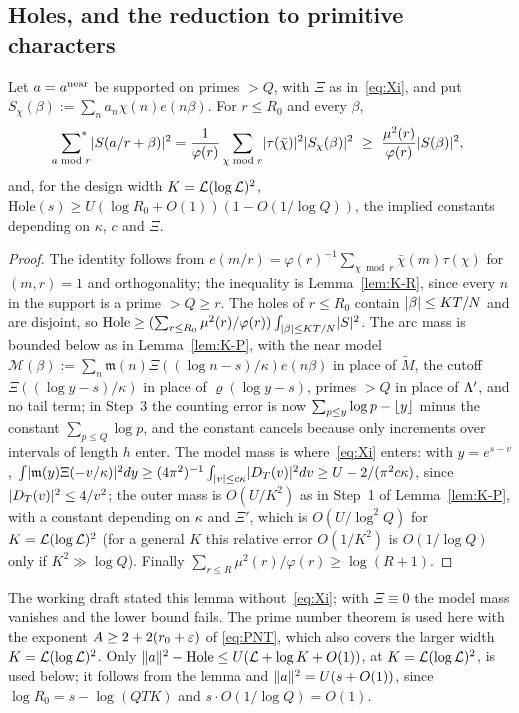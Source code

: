 \subsection{Holes, and the reduction to primitive characters}\label{ssec:shell-holes}
\begin{lemma}\label{lem:shell-4}
Let $a=a^{\rm near}$ be supported on primes $>Q$, with $\Xi$ as in~\eqref{eq:Xi}, and put $S_\chi(\beta):=\sum_na_n\chi(n)e(n\beta)$. For $r\le R_0$ and every
$\beta$,
\begin{equation}\label{eq:shell-gauss}
\sideset{}{^*}\sum_{a\bmod r}\abs{S(a/r+\beta)}^2=\frac1{\varphi(r)}\sum_{\chi\bmod r}\abs{\tau(\bar\chi)}^2\abs{S_\chi(\beta)}^2\ \ge\ \frac{\mu^2(r)}{\varphi(r)}\abs{S(\beta)}^2,
\end{equation}
and, for the design width $K=\mathcal L(\log\mathcal L)^2$, $\mathrm{Hole}(s)\ge U(\log R_0+O(1))(1-O(1/\log Q))$, the implied constants depending on $\kappa$, $c$ and $\Xi$.
\end{lemma}
\begin{proof}
The identity follows from $e(m/r)=\varphi(r)^{-1}\sum_{\chi\bmod r}\bar\chi(m)\tau(\chi)$ for $(m,r)=1$ and orthogonality; the inequality is
Lemma~\ref{lem:K-R}, since every $n$ in the support is a prime $>Q\ge r$. The holes of $r\le R_0$ contain $\lvert \beta\rvert\le KT/N$ and are disjoint, so
$\mathrm{Hole}\ge(\sum_{r\le R_0}\mu^2(r)/\varphi(r))\int_{\lvert \beta\rvert\le KT/N}\lvert S\rvert^2$. The arc mass is bounded below as in Lemma~\ref{lem:K-P}, with the
near model $\mathcal M(\beta):=\sum_n\mathfrak m(n)\Xi((\log n-s)/\kappa)e(n\beta)$ in place of $\tilde M$, the cutoff $\Xi((\log y-s)/\kappa)$ in place of $\varrho(\log y-s)$, primes
$>Q$ in place of $\Lambda'$, and no tail term; in Step~3 the counting error is now $\sum_{p\le y}\log p-\lfloor y\rfloor$ minus the constant $\sum_{p\le Q}\log p$, and the
constant cancels because only increments over intervals of length $h$ enter. The model mass is where~\eqref{eq:Xi} enters: with $y=e^{s-v}$,
$\int\lvert \mathfrak m(y)\Xi(-v/\kappa)\rvert^2dy\ge(4\pi^2)^{-1}\int_{\lvert v\rvert\le c\kappa}\lvert D_T(v)\rvert^2dv\ge U-2/(\pi^2c\kappa)$, since $\lvert D_T(v)\rvert^2\le4/v^2$; the outer mass is
$O(U/K^2)$ as in Step~1 of Lemma~\ref{lem:K-P}, with a constant depending on $\kappa$ and $\Xi'$, which is $O(U/\log^2Q)$ for $K=\mathcal L(\log\mathcal L)^2$ (for a
general $K$ this relative error $O(1/K^2)$ is $O(1/\log Q)$ only if $K^2\gg\log Q$). Finally
$\sum_{r\le R}\mu^2(r)/\varphi(r)\ge\log(R+1)$.
\end{proof}
The working draft stated this lemma without~\eqref{eq:Xi}; with $\Xi\equiv0$ the model mass vanishes and the lower bound fails.
The prime number theorem is used here with the exponent $A\ge2+2(r_0+\varepsilon)$ of
\eqref{eq:PNT}, which also covers the larger width $K=\mathcal L(\log\mathcal L)^2$.
Only $\lVert a\rVert^2-\mathrm{Hole}\le U(\mathcal L+\log K+O(1))$, at $K=\mathcal L(\log\mathcal L)^2$, is used below; it follows from the lemma and $\lVert a\rVert^2=U(s+O(1))$, since
$\log R_0=s-\log(QTK)$ and $s\cdot O(1/\log Q)=O(1)$.

